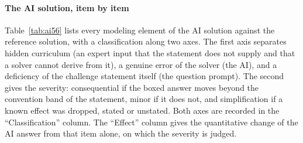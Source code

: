 \paragraph*{The AI solution, item by item}
Table~\ref{tab:ai56} lists every modeling element of the AI solution against the reference solution, with a classification along two axes. The first axis separates hidden curriculum (an expert input that the statement does not supply and that a solver cannot derive from it), a genuine error of the solver (the AI), and a deficiency of the challenge statement itself (the question prompt). The second gives the severity: consequential if the boxed answer moves beyond the convention band of the statement, minor if it does not, and simplification if a known effect was dropped, stated or unstated. Both axes are recorded in the ``Classification'' column. The ``Effect'' column gives the quantitative change of the AI answer from that item alone, on which the severity is judged.

